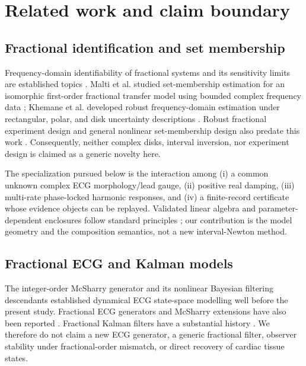 \documentclass[11pt]{article}
\theoremstyle{definition}
\theoremstyle{remark}
\begin{document}
\section{Related work and claim boundary}

\subsection{Fractional identification and set membership}

Frequency-domain identifiability of fractional systems and its sensitivity
limits are established topics \cite{nazarian2010}.  Malti et al. studied
set-membership estimation for an isomorphic first-order fractional transfer
model using bounded complex frequency data \cite{malti2010}; Khemane et al.
developed robust frequency-domain estimation under rectangular, polar, and
disk uncertainty descriptions \cite{khemane2012}.  Robust fractional
experiment design and general nonlinear set-membership design also predate
this work \cite{abrashov2017,karimshoushtari2020}.  Consequently, neither
complex disks, interval inversion, nor experiment design is claimed as a
generic novelty here.

The specialization pursued below is the interaction among (i) a common
unknown complex ECG morphology/lead gauge, (ii) positive real damping, (iii)
multi-rate phase-locked harmonic responses, and (iv) a finite-record
certificate whose evidence objects can be replayed.  Validated linear algebra
and parameter-dependent enclosures follow standard principles
\cite{neumaier1989,rump2010,goldsztejn2006,ponleitner2021}; our contribution is
the model geometry and the composition semantics, not a new interval-Newton
method.

\subsection{Fractional ECG and Kalman models}

The integer-order McSharry generator \cite{mcsharry2003} and its nonlinear
Bayesian filtering descendants \cite{sameni2007} established dynamical ECG
state-space modelling well before the present study.  Fractional ECG
generators and McSharry extensions have also been reported
\cite{das2013,takha2024}.  Fractional Kalman filters have a substantial
history \cite{sierociuk2006,sierociuk2021,yu2026}.  We therefore do not claim
a new ECG generator, a generic fractional filter, observer stability under
fractional-order mismatch, or direct recovery of cardiac tissue states.
\end{document}
